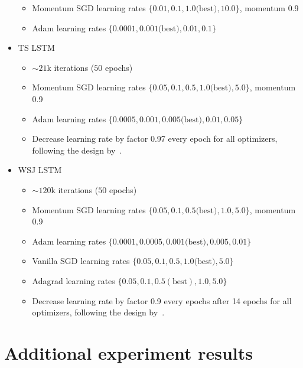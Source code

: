 \begin{itemize}
\begin{itemize}
			\item Momentum SGD learning rates $\{0.01, 0.1, 1.0 \text{(best)}, 10.0\}$, momentum 0.9
			\item Adam learning rates $\{0.0001, 0.001 \text{(best)}, 0.01, 0.1\}$
		\end{itemize}
	\item TS LSTM
		\begin{itemize}
			\item ${\sim}21$k iterations ($50$ epochs)
			\item Momentum SGD learning rates $\{0.05, 0.1, 0.5, 1.0 \text{(best)}, 5.0\}$, momentum 0.9
			\item Adam learning rates $\{0.0005, 0.001, 0.005 \text{(best)}, 0.01, 0.05\}$
			\item Decrease learning rate by factor 0.97 every epoch for all optimizers, following the design by~\citet{karpathy2015visualizing}.
		\end{itemize}
	\item WSJ LSTM
		\begin{itemize}
			\item ${\sim} 120$k iterations ($50$ epochs)
			\item Momentum SGD learning rates $\{0.05, 0.1, 0.5 \text{(best)}, 1.0, 5.0\}$, momentum 0.9
			\item Adam learning rates $\{0.0001, 0.0005, 0.001 \text{(best)}, 0.005, 0.01\}$
			\item Vanilla SGD learning rates $\{0.05, 0.1, 0.5, 1.0 \text{(best)}, 5.0\}$
			\item Adagrad learning rates $\{0.05, 0.1, 0.5 (\text{best}), 1.0, 5.0\}$
			\item Decrease learning rate by factor 0.9 every epochs after 14 epochs for all optimizers, following the design by~\citet{charniakparsing}.
		\end{itemize}
\end{itemize}

\section{Additional experiment results}
\label{sec:add_exp}
